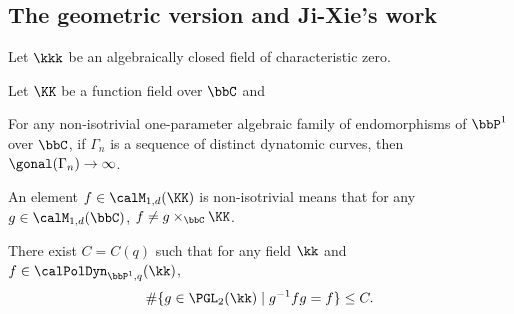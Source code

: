 

\subsection{The geometric version and Ji-Xie's work}


Let $\kkk$ be an algebraically closed field of characteristic zero.

\begin{conjecture}
	Let $\KK$ be a function field over $\bbC$ and
	\Yang{}
\end{conjecture}


\begin{conjecture}
	For any non-isotrivial one-parameter algebraic family of endomorphisms of $\bbP^1$ over $\bbC$, if $\Gamma_n$ is a sequence of distinct dynatomic curves, then $\gonal(\Gamma_n) \to \infty$.
\end{conjecture}

An element $f \in \calM_{1,d}(\KK)$ is non-isotrivial means that for any $g \in \calM_{1,d}(\bbC)$, $f \neq g \times_\bbC \KK$.

\begin{theorem}
  There exist $C = C(q)$ such that for any field $\kk$ and $f \in \calPolDyn_{\bbP^1,q}(\kk)$, 
	\[ \# \{g \in \PGL_2(\kk) \;|\; g^{-1}fg = f \} \leq C. \]
\end{theorem}



